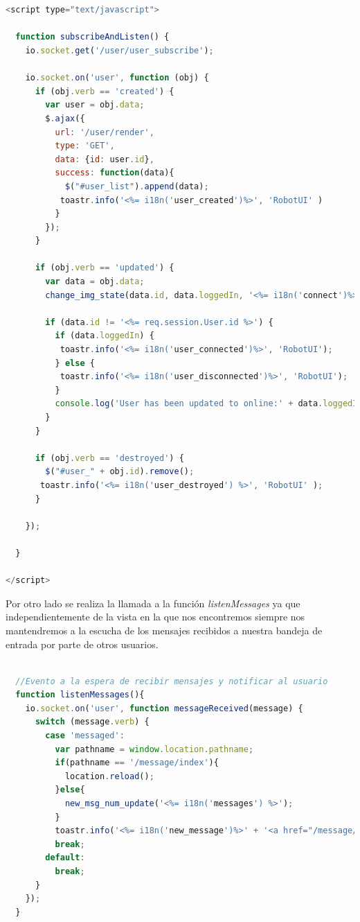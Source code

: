 \begin{lstlisting}[language=JavaScript]


<script type="text/javascript">

  function subscribeAndListen() {
    io.socket.get('/user/user_subscribe');

    io.socket.on('user', function (obj) {
      if (obj.verb == 'created') {
        var user = obj.data;
        $.ajax({
          url: '/user/render',
          type: 'GET',
          data: {id: user.id},
          success: function(data){
            $("#user_list").append(data);
           toastr.info('<%= i18n('user_created')%>', 'RobotUI' )
          }
        });
      }

      if (obj.verb == 'updated') {
        var data = obj.data;
        change_img_state(data.id, data.loggedIn, '<%= i18n('connect')%>', '<%= i18n('disconnect')%>');

        if (data.id != '<%= req.session.User.id %>') {
          if (data.loggedIn) {
           toastr.info('<%= i18n('user_connected')%>', 'RobotUI');
          } else {
           toastr.info('<%= i18n('user_disconnected')%>', 'RobotUI');
          }
          console.log('User has been updated to online:' + data.loggedIn);
        }
      }

      if (obj.verb == 'destroyed') {
        $("#user_" + obj.id).remove();
       toastr.info('<%= i18n('user_destroyed') %>', 'RobotUI' );
      }

    });

  }

</script>

\end{lstlisting}


Por otro lado se realiza la llamada a la función \emph{listenMessages} ya que independientemente de la vista en la que nos encontremos siempre nos mantendremos a la escucha de los mensajes 
recibidos a nuestra bandeja de entrada por parte de otros usuarios.\\

\begin{lstlisting}[language=JavaScript]

  //Evento a la espera de recibir mensajes y notificar al usuario
  function listenMessages(){
    io.socket.on('user', function messageReceived(message) {
      switch (message.verb) {
        case 'messaged':
          var pathname = window.location.pathname;
          if(pathname == '/message/index'){
            location.reload();
          }else{
            new_msg_num_update('<%= i18n('messages') %>');
          }
          toastr.info('<%= i18n('new_message')%>' + '<a href="/message/index"> <%= i18n('open_here')%> </a>' , 'RobotUI');
          break;
        default:
          break;
      }
    });
  }
\end{lstlisting}



